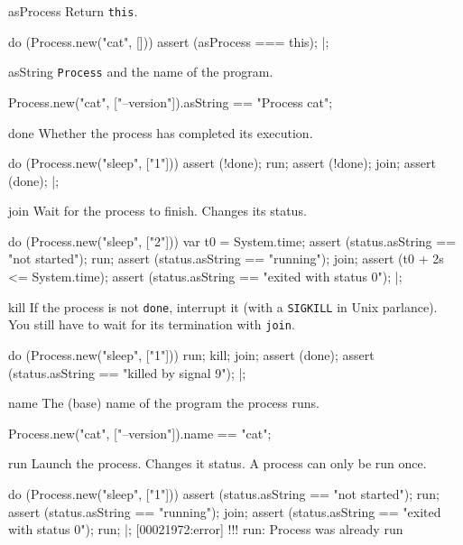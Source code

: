 \begin{urbiscriptapi}
\item[asProcess] Return \lstinline|this|.
\begin{urbiscript}
do (Process.new("cat", []))
{
  assert (asProcess === this);
}|;
\end{urbiscript}

\item[asString] \lstinline|Process| and the name of the program.
\begin{urbiassert}
Process.new("cat", ["--version"]).asString
  == "Process cat";
\end{urbiassert}

\item[done] Whether the process has completed its execution.
\begin{urbiscript}
do (Process.new("sleep", ["1"]))
{
  assert (!done);
  run;
  assert (!done);
  join;
  assert (done);
}|;
\end{urbiscript}


\item[join] Wait for the process to finish.  Changes its status.
\begin{urbiscript}
do (Process.new("sleep", ["2"]))
{
  var t0 = System.time;
  assert (status.asString == "not started");
  run;
  assert (status.asString == "running");
  join;
  assert (t0 + 2s <= System.time);
  assert (status.asString == "exited with status 0");
}|;
\end{urbiscript}

\item[kill] If the process is not \lstinline|done|, interrupt it (with
  a \lstinline|SIGKILL| in Unix parlance).  You still have to wait for
  its termination with \lstinline|join|.
\begin{urbiscript}
do (Process.new("sleep", ["1"]))
{
  run;
  kill;
  join;
  assert (done);
  assert (status.asString == "killed by signal 9");
}|;
\end{urbiscript}


\item[name] The (base) name of the program the process runs.
\begin{urbiassert}
Process.new("cat", ["--version"]).name == "cat";
\end{urbiassert}

\item[run] Launch the process.  Changes it status.  A process can only
  be run once.
\begin{urbiscript}
do (Process.new("sleep", ["1"]))
{
  assert (status.asString == "not started");
  run;
  assert (status.asString == "running");
  join;
  assert (status.asString == "exited with status 0");
  run;
}|;
[00021972:error] !!! run: Process was already run
\end{urbiscript}


\end{urbiscriptapi}
